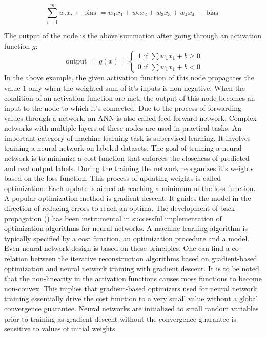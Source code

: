 \begin{equation}
\sum_{i=1}^{m} w_{i} x_{i}+\text { bias }=w_{1} x_{1}+w_{2} x_{2}+w_{3} x_{3}+w_{4} x_{4}+\text { bias }
\end{equation}

The output of the node is the above summation after going through an activation function $g$:
\begin{equation}
\text { output }=g(x)=\left\{\begin{array}{l}
1 \text { if } \sum w_{1} x_{1}+b \geq 0 \\
0 \text { if } \sum w_{1} x_{1}+b<0
\end{array}\right.
\end{equation}
In the above example, the given activation function of this node propagates the value $1$ only when the weighted sum of it's inputs is non-negative. When the condition of an activation function are met, the output of this node becomes an input to the node to which it's connected. Due to the process of forwarding values through a network, an \ac{ANN} is also called feed-forward network. Complex networks with multiple layers of these nodes are used in practical tasks. An important category of machine learning task is supervised learning. It involves training a neural network on labeled datasets. The goal of training a neural network is to minimize a cost function that enforces the closeness of predicted and real output labels. During the training the network reorganizes it's weights based on the loss function. This process of updating weights is called optimization. Each update is aimed at reaching a minimum of the loss function. A popular optimization method is gradient descent. It guides the model in the direction of reducing errors to reach an optima. The development of back-propagation (\cite{rumelhart1986learning}) has been instrumental in successful implementation of optimization algorithms for neural networks. A machine learning algorithm is typically specified by a cost function, an optimization procedure and a model. Even neural network design is based on these principles. One can find a co-relation between the iterative reconstruction algorithms based on gradient-based optimization and neural network training with gradient descent. It is to be noted that the non-linearity in the activation functions causes moss functions to become non-convex. This implies that gradient-based optimizers used for neural network training essentially drive the cost function to a very small value without a global convergence guarantee. Neural networks are initialized to small random variables prior to training as gradient descent without the convergence guarantee is sensitive to values of initial weights. 
 

